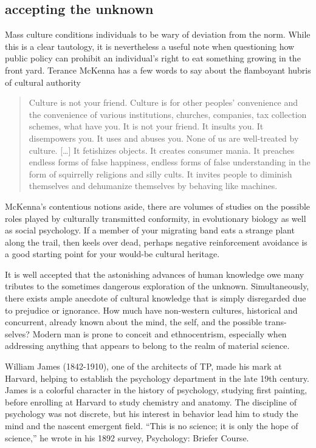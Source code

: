\documentclass{UIdahoMastersThesis}
\begin{document}
\subsection{accepting the unknown}

Mass culture conditions individuals to be wary of deviation from the norm. While this is a clear tautology, it is nevertheless a useful note when questioning how public policy can prohibit an individual's right to eat something growing in the front yard. Terance McKenna has a few words to say about the flamboyant hubris of cultural authority

\begin{quote}
{Culture is not your friend. Culture is for other peoples' convenience and the convenience of various institutions, churches, companies, tax collection schemes, what have you. It is not your friend. It insults you. It disempowers you. It uses and abuses you. None of us are well-treated by culture. [\ldots] It fetishizes objects. It creates consumer mania. It preaches endless forms of false happiness, endless forms of false understanding in the form of squirrelly religions and silly cults. It invites people to diminish themselves and dehumanize themselves by behaving like machines.}
\end{quote}

McKenna's contentious notions aside, there are volumes of studies on the possible roles played by culturally transmitted conformity, in evolutionary biology as well as social psychology. If a member of your migrating band eats a strange plant along the trail, then keels over dead, perhaps negative reinforcement avoidance is a good starting point for your would-be cultural heritage.

It is well accepted that the astonishing advances of human knowledge owe many tributes to the sometimes dangerous exploration of the unknown. Simultaneously, there exists ample anecdote of cultural knowledge that is simply disregarded due to prejudice or ignorance. How much have non-western cultures, historical and concurrent, already known about the mind, the self, and the possible trans-selves? Modern man is prone to conceit and ethnocentrism, especially when addressing anything that appears to belong to the realm of material science.

William James (1842-1910), one of the architects of TP, made his mark at Harvard, helping to establish the psychology department in the late 19th century. James is a colorful character in the history of psychology, studying first painting, before enrolling at Harvard to study chemistry and anatomy. The discipline of psychology was not discrete, but his interest in behavior lead him to study the mind and the nascent emergent field. \enquote{This is no science; it is only the hope of science,} he wrote in his 1892 survey, Psychology: Briefer Course. 
\end{document}
